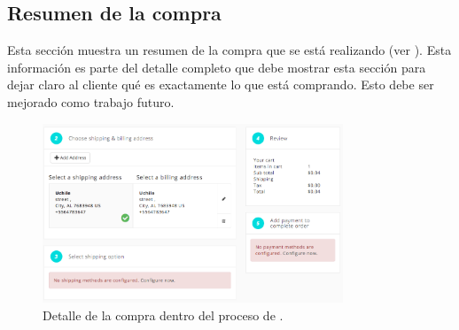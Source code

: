 \subsection{Resumen de la compra}\label{chapter:solucionimplementada:checkout:review}

	Esta sección muestra un resumen de la compra que se está realizando (ver ). Esta información es parte del detalle completo que debe mostrar esta sección para dejar claro al cliente qué es exactamente lo que está comprando. Esto debe ser mejorado como trabajo futuro.

	\begin{figure}[!h]
		\centering
		\includegraphics[width=0.8\textwidth]{figuras/shipping/steps.png}
		\caption{Detalle de la compra dentro del proceso de \checkoutEF.}
		\label{figure:review:checkout:summary}
	\end{figure}